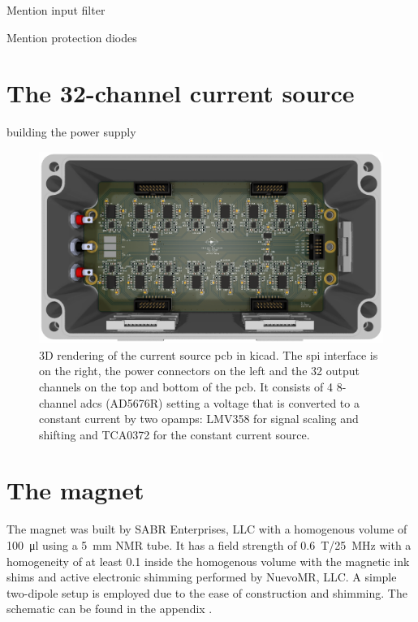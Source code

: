Mention input filter

Mention protection diodes

\section{The 32-channel current source}
building the power supply
\begin{figure}[hbt]
    \centering
    \includegraphics[width=\textwidth]{images/32-channel_current_source.png}
    \caption{ 3D rendering of the current source \acrshort{pcb} in \gls{kicad}. The \acrshort{spi} interface is on the right, the power connectors on the left and the 32 output channels on the top and bottom of the \acrshort{pcb}. It consists of 4 8-channel \acrshort{adc}s (AD5676R) setting a voltage that is converted to a constant current by two \acrshort{opamp}s: LMV358 for signal scaling and shifting and TCA0372 for the constant current source.}
\end{figure}

\section{The magnet}
The magnet was built by SABR Enterprises, LLC with a homogenous volume of \qty{100}{\micro\litre} using a \qty{5}{\milli\metre} NMR tube. It has a field strength of \qty{0.6}{\tesla}/\qty{25}{\mega\hertz} with a homogeneity of at least \qty{0.1}{\partspermillion} inside the homogenous volume with the magnetic ink shims and active electronic shimming performed by NuevoMR, LLC. A simple two-dipole setup is employed due to the ease of construction and shimming. The schematic can be found in the appendix .

